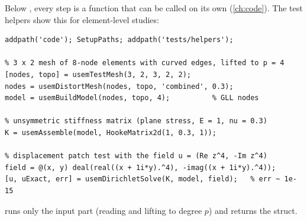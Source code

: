 Below , every step is a function that can be called on its
own (\cref{ch:code}). The test helpers show this for element-level studies:
\begin{lstlisting}
addpath('code'); SetupPaths; addpath('tests/helpers');

% 3 x 2 mesh of 8-node elements with curved edges, lifted to p = 4
[nodes, topo] = usemTestMesh(3, 2, 3, 2, 2);
nodes = usemDistortMesh(nodes, topo, 'combined', 0.3);
model = usemBuildModel(nodes, topo, 4);          % GLL nodes

% unsymmetric stiffness matrix (plane stress, E = 1, nu = 0.3)
K = usemAssemble(model, HookeMatrix2d(1, 0.3, 1));

% displacement patch test with the field u = (Re z^4, -Im z^4)
field = @(x, y) deal(real((x + 1i*y).^4), -imag((x + 1i*y).^4));
[u, uExact, err] = usemDirichletSolve(K, model, field);   % err ~ 1e-15
\end{lstlisting}
 runs only the input part (reading and lifting to
degree $p$) and returns the  struct.
